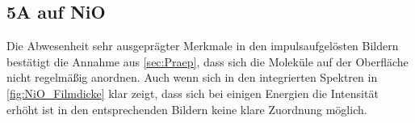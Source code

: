         \subsection{5A auf NiO}
                Die Abwesenheit sehr ausgeprägter Merkmale in den impulsaufgelösten Bildern bestätigt die Annahme aus \autoref{sec:Praep}, dass sich die Moleküle auf der Oberfläche nicht regelmäßig anordnen.
                Auch wenn sich in den integrierten Spektren in \autoref{fig:NiO_Filmdicke} klar zeigt, dass sich bei einigen Energien die Intensität erhöht ist in den entsprechenden Bildern keine klare Zuordnung möglich.

